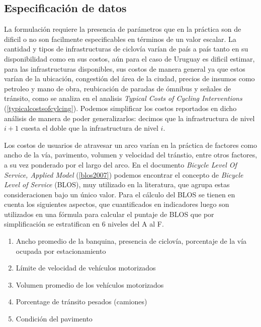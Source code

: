 \documentclass{article}
\begin{document}
  \subsection*{Especificación de datos}

  La formulación requiere la presencia de parámetros que en la práctica son de dificil o no son facilmente especificables en términos de un valor escalar. La cantidad y tipos de infrastructuras de ciclovía varían de país a país tanto en su disponibilidad como en sus costos, aún para el caso de Uruguay es dificil estimar, para las infrastructuras disponibles, sus costos de manera general ya que estos varían de la ubicación, congestión del área de la ciudad, precios de insumos como petroleo y mano de obra, reubicación de paradas de ómnibus y señales de tránsito, como se analiza en el analisis {\it Typical Costs of Cycling Interventions} (\ref{typicalcostsofcylcing}). Podemos simplificar los costos reportados en dicho análisis de manera de poder generalizarlos: decimos que la infrastructura de nivel $i+1$ cuesta el doble que la infrastructura de nivel $i$.

  Los costos de usuarios de atravesar un arco varían en la práctica de factores como ancho de la vía, pavimento, volumen y velocidad del tránstio, entre otros factores, a su vez ponderado por el largo del arco. En el documento {\it Bicycle Level Of Service, Applied Model} (\ref{blos2007}) podemos encontrar el concepto de {\it Bicycle Level of Service} (BLOS), muy utilizado en la literatura, que agrupa estas consideracionen bajo un único valor. Para el cálculo del BLOS se tienen en cuenta los siguientes aspectos, que cuantificados en indicadores luego son utilizados en una fórmula para calcular el puntaje de BLOS que por simplificación se estratifican en 6 niveles del A al F.

  \begin{enumerate}
    \item{Ancho promedio de la banquina, presencia de ciclovía, porcentaje de la vía ocupada por estacionamiento}
    \item{Límite de velocidad de vehículos motorizados}
    \item{Volumen promedio de los vehículos motorizados}
    \item{Porcentage de tránsito pesados (camiones)}
    \item{Condición del pavimento}
  \end{enumerate}
\end{document}
